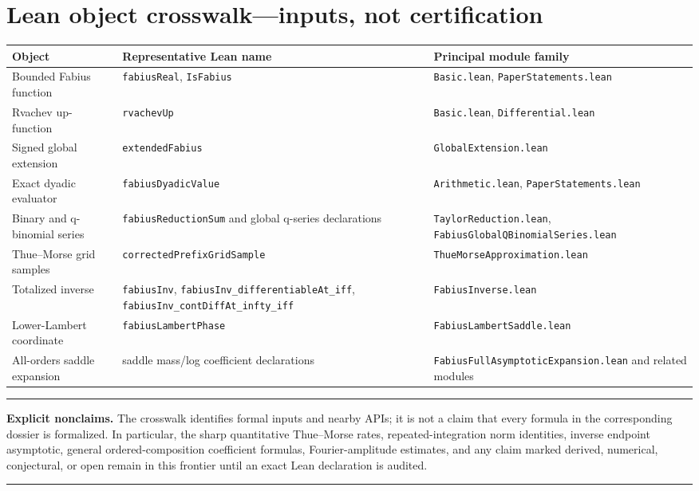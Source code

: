 \documentclass[11pt,oneside]{article}
\theoremstyle{definition}
\theoremstyle{remark}
\newenvironment{boxedremark}{%
  \par\smallskip\noindent\begin{center}\begin{minipage}{0.94\textwidth}%
  \color{black}\hrule\vspace{0.6em}\small
}{%
  \vspace{0.6em}\hrule\end{minipage}\end{center}\smallskip
}
\begin{document}
\section*{Lean object crosswalk---inputs, not certification}
\begin{longtable}{@{}p{}p{}p{}@{}}
\toprule
Object & Representative Lean name & Principal module family \\
\midrule
\endhead
Bounded Fabius function & \nolinkurl{fabiusReal}, \nolinkurl{IsFabius} & \nolinkurl{Basic.lean}, \nolinkurl{PaperStatements.lean} \\
Rvachev up-function & \nolinkurl{rvachevUp} & \nolinkurl{Basic.lean}, \nolinkurl{Differential.lean} \\
Signed global extension & \nolinkurl{extendedFabius} & \nolinkurl{GlobalExtension.lean} \\
Exact dyadic evaluator & \nolinkurl{fabiusDyadicValue} & \nolinkurl{Arithmetic.lean}, \nolinkurl{PaperStatements.lean} \\
Binary and q-binomial series & \nolinkurl{fabiusReductionSum} and global q-series declarations & \nolinkurl{TaylorReduction.lean}, \nolinkurl{FabiusGlobalQBinomialSeries.lean} \\
Thue--Morse grid samples & \nolinkurl{correctedPrefixGridSample} & \nolinkurl{ThueMorseApproximation.lean} \\
Totalized inverse & \nolinkurl{fabiusInv}, \nolinkurl{fabiusInv_differentiableAt_iff}, \nolinkurl{fabiusInv_contDiffAt_infty_iff} & \nolinkurl{FabiusInverse.lean} \\
Lower-Lambert coordinate & \nolinkurl{fabiusLambertPhase} & \nolinkurl{FabiusLambertSaddle.lean} \\
All-orders saddle expansion & saddle mass/log coefficient declarations & \nolinkurl{FabiusFullAsymptoticExpansion.lean} and related modules \\
\bottomrule
\end{longtable}

\begin{boxedremark}
\textbf{Explicit nonclaims.}
The crosswalk identifies formal inputs and nearby APIs; it is not a claim that every formula
in the corresponding dossier is formalized.  In particular, the sharp quantitative
Thue--Morse rates, repeated-integration norm identities, inverse endpoint asymptotic,
general ordered-composition coefficient formulas, Fourier-amplitude estimates, and any
claim marked derived, numerical, conjectural, or open remain in this frontier until an exact
Lean declaration is audited.
\end{boxedremark}
\end{document}
